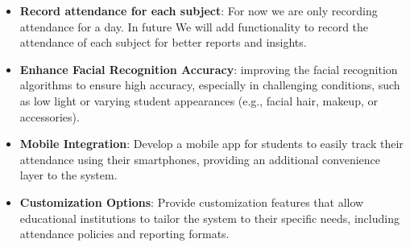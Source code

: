 \begin{itemize}
\item \textbf {Record attendance for each subject}: For now we are only recording attendance for a day. In future We will add functionality to record the attendance of each subject for better reports and insights.

\item \textbf { Enhance Facial Recognition Accuracy}: improving the facial recognition algorithms to ensure high accuracy, especially in challenging conditions, such as low light or varying student appearances (e.g., facial hair, makeup, or accessories).

\item \textbf{ Mobile Integration}: Develop a mobile app for students to easily track their attendance using their smartphones, providing an additional convenience layer to the system.

\item \textbf{ Customization Options}: Provide customization features that allow educational institutions to tailor the system to their specific needs, including attendance policies and reporting formats.


\end{itemize}


